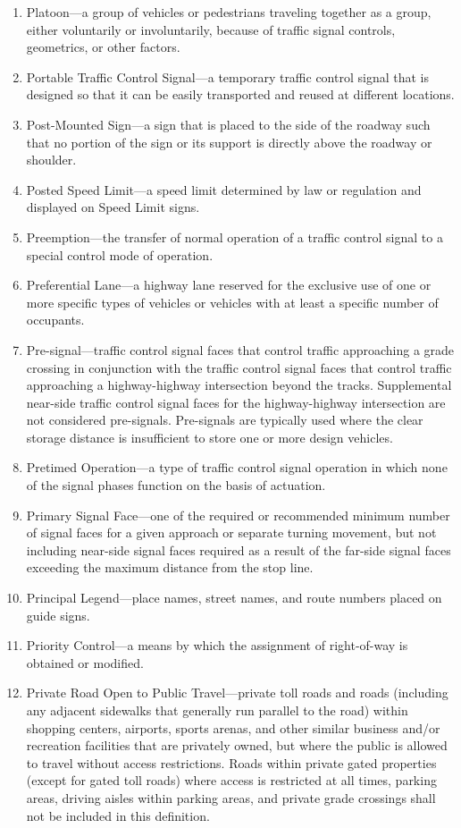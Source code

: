 \documentclass[9pt]{memoir}
\begin{document}
{\begin{enumerate}[label=\arabic*., ref=\arabic*]
\item Platoon---a group of vehicles or pedestrians traveling together as a group, either voluntarily or involuntarily, because of traffic signal controls, geometrics, or other factors.
\item Portable Traffic Control Signal---a temporary traffic control signal that is designed so that it can be easily transported and reused at different locations.
\item Post-Mounted Sign---a sign that is placed to the side of the roadway such that no portion of the sign or its support is directly above the roadway or shoulder.
\item Posted Speed Limit---a speed limit determined by law or regulation and displayed on Speed Limit signs.
\item Preemption---the transfer of normal operation of a traffic control signal to a special control mode of operation.
\item Preferential Lane---a highway lane reserved for the exclusive use of one or more specific types of vehicles or vehicles with at least a specific number of occupants.
\item Pre-signal---traffic control signal faces that control traffic approaching a grade crossing in conjunction with the traffic control signal faces that control traffic approaching a highway-highway intersection beyond the tracks. Supplemental near-side traffic control signal faces for the highway-highway intersection are not considered pre-signals. Pre-signals are typically used where the clear storage distance is insufficient to store one or more design vehicles.
\item Pretimed Operation---a type of traffic control signal operation in which none of the signal phases function on the basis of actuation.
\item Primary Signal Face---one of the required or recommended minimum number of signal faces for a given approach or separate turning movement, but not including near-side signal faces required as a result of the far-side signal faces exceeding the maximum distance from the stop line.
\item Principal Legend---place names, street names, and route numbers placed on guide signs.
\item Priority Control---a means by which the assignment of right-of-way is obtained or modified.
\item Private Road Open to Public Travel---private toll roads and roads (including any adjacent sidewalks that generally run parallel to the road) within shopping centers, airports, sports arenas, and other similar business and/or recreation facilities that are privately owned, but where the public is allowed to travel without access restrictions. Roads within private gated properties (except for gated toll roads) where access is restricted at all times, parking areas, driving aisles within parking areas, and private grade crossings shall not be included in this definition.

\end{enumerate}}
\end{document}
